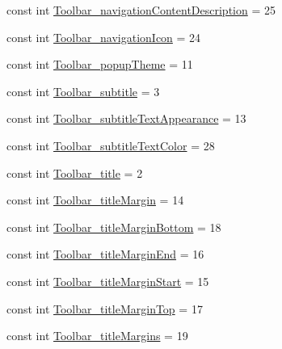 \begin{DoxyCompactItemize}
\item 
const int \mbox{\hyperlink{class_f_w_p_s___app_1_1_droid_1_1_resource_1_1_styleable_aeb85d0bf97d4231017c94a6ec468b51a}{Toolbar\+\_\+navigation\+Content\+Description}} = 25
\item 
const int \mbox{\hyperlink{class_f_w_p_s___app_1_1_droid_1_1_resource_1_1_styleable_afc87dada556e72465216b34afdd775ad}{Toolbar\+\_\+navigation\+Icon}} = 24
\item 
const int \mbox{\hyperlink{class_f_w_p_s___app_1_1_droid_1_1_resource_1_1_styleable_a3100f1151778170d8e53d44441e8892d}{Toolbar\+\_\+popup\+Theme}} = 11
\item 
const int \mbox{\hyperlink{class_f_w_p_s___app_1_1_droid_1_1_resource_1_1_styleable_aa35d9c4657b4c26e1764c176427a495b}{Toolbar\+\_\+subtitle}} = 3
\item 
const int \mbox{\hyperlink{class_f_w_p_s___app_1_1_droid_1_1_resource_1_1_styleable_ae273e4e52688413e33e0b1478edfd199}{Toolbar\+\_\+subtitle\+Text\+Appearance}} = 13
\item 
const int \mbox{\hyperlink{class_f_w_p_s___app_1_1_droid_1_1_resource_1_1_styleable_aa893d0fe3aa3dabe28a00fff3e09f4be}{Toolbar\+\_\+subtitle\+Text\+Color}} = 28
\item 
const int \mbox{\hyperlink{class_f_w_p_s___app_1_1_droid_1_1_resource_1_1_styleable_a06d36af0db849ffe188867cba73bcf78}{Toolbar\+\_\+title}} = 2
\item 
const int \mbox{\hyperlink{class_f_w_p_s___app_1_1_droid_1_1_resource_1_1_styleable_abbcb3ef067110b61e97d78b67c791fac}{Toolbar\+\_\+title\+Margin}} = 14
\item 
const int \mbox{\hyperlink{class_f_w_p_s___app_1_1_droid_1_1_resource_1_1_styleable_a53d57475b223c8f5a77ef1625dcd9c0b}{Toolbar\+\_\+title\+Margin\+Bottom}} = 18
\item 
const int \mbox{\hyperlink{class_f_w_p_s___app_1_1_droid_1_1_resource_1_1_styleable_aa32f3ec35eb9587fd496b4fcaeb225a9}{Toolbar\+\_\+title\+Margin\+End}} = 16
\item 
const int \mbox{\hyperlink{class_f_w_p_s___app_1_1_droid_1_1_resource_1_1_styleable_a58f5e94d6f04a2011fb45669b5848b8e}{Toolbar\+\_\+title\+Margin\+Start}} = 15
\item 
const int \mbox{\hyperlink{class_f_w_p_s___app_1_1_droid_1_1_resource_1_1_styleable_a0cc5fbf4b538fb3b0affe61e907bd88a}{Toolbar\+\_\+title\+Margin\+Top}} = 17
\item 
const int \mbox{\hyperlink{class_f_w_p_s___app_1_1_droid_1_1_resource_1_1_styleable_a37e3947d9e4f14a8abb2f9ae27565580}{Toolbar\+\_\+title\+Margins}} = 19

\end{DoxyCompactItemize}
